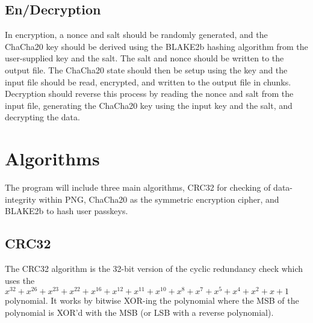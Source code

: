 \documentclass{report}
\begin{document}
\subsection{En/Decryption}

In encryption, a nonce and salt should be randomly generated, and the ChaCha20 key should be derived using the BLAKE2b hashing algorithm from the user-supplied key and the salt. The salt and nonce should be written to the output file. The ChaCha20 state should then be setup using the key and the input file should be read, encrypted, and written to the output file in chunks.
Decryption should reverse this process by reading the nonce and salt from the input file, generating the ChaCha20 key using the input key and the salt, and decrypting the data.

\section{Algorithms}

The program will include three main algorithms, CRC32 for checking of data-integrity within PNG, ChaCha20 as the symmetric encryption cipher, and BLAKE2b to hash user passkeys.

\subsection{CRC32}

The CRC32 algorithm is the 32-bit version of the cyclic redundancy check which uses the $x^{32}+x^{26}+x^{23}+x^{22}+x^{16}+x^{12}+x^{11}+x^{10}+x^8+x^7+x^5+x^4+x^2+x+1$ polynomial. It works by bitwise XOR-ing the polynomial where the MSB of the polynomial is XOR'd with the MSB (or LSB with a reverse polynomial). 
\end{document}
